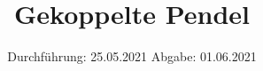 

\subject{Versuch Nr.106}
\title{Gekoppelte Pendel}
\date{%
  Durchführung: 25.05.2021
  \hspace{3em}
  Abgabe: 01.06.2021
}



\maketitle
\thispagestyle{empty}
\tableofcontents
\newpage 






%


\nocite{*}

\printbibliography



